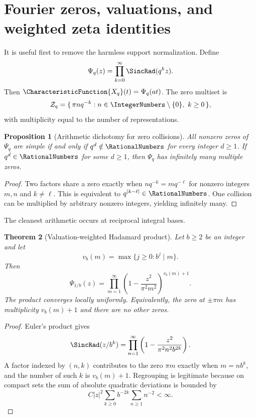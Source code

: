 \documentclass[11pt,oneside]{article}
\newtheorem{theorem}{Theorem}[section]
\newtheorem{proposition}[theorem]{Proposition}
\theoremstyle{definition}
\theoremstyle{remark}
\begin{document}
\section{Fourier zeros, valuations, and weighted zeta identities}
\label{sec:zeros}

It is useful first to remove the harmless support normalization.  Define
\begin{equation}
 \Psi_q(z)=\prod_{k=0}^{\infty}\SincRad(q^kz).
 \label{eq:Psiq}
\end{equation}
Then $\CharacteristicFunction{X_q}(t)=\Psi_q(at)$.  The zero multiset is
\begin{equation}
 \mathcal Z_q=\{\,\pi n q^{-k}:n\in\IntegerNumbers\setminus\{0\},\ k\ge0\,\},
 \label{eq:zero-multiset}
\end{equation}
with multiplicity equal to the number of representations.

\begin{proposition}[Arithmetic dichotomy for zero collisions]
All nonzero zeros of $\Psi_q$ are simple if and only if
$q^d\notin\RationalNumbers$ for every integer $d\ge1$.  If $q^d\in\RationalNumbers$ for some
$d\ge1$, then $\Psi_q$ has infinitely many multiple zeros.
\end{proposition}

\begin{proof}
Two factors share a zero exactly when
$nq^{-k}=mq^{-\ell}$ for nonzero integers $m,n$ and $k\ne\ell$.  This is equivalent to
$q^{|k-\ell|}\in\RationalNumbers$.  One collision can be multiplied by arbitrary nonzero
integers, yielding infinitely many.
\end{proof}

The cleanest arithmetic occurs at reciprocal integral bases.

\begin{theorem}[Valuation-weighted Hadamard product]
\label{thm:hadamard-valuation}
Let $b\ge2$ be an integer and let
\[
 v_b(m)=\max\{j\ge0:b^j\mid m\}.
\]
Then
\begin{equation}
 \Psi_{1/b}(z)=
 \prod_{m=1}^{\infty}
 \left(1-\frac{z^2}{\pi^2m^2}\right)^{v_b(m)+1}.
 \label{eq:valuation-hadamard}
\end{equation}
The product converges locally uniformly.  Equivalently, the zero at $\pm\pi m$ has
multiplicity $v_b(m)+1$ and there are no other zeros.
\end{theorem}

\begin{proof}
Euler's product gives
\[
 \SincRad(z/b^k)=\prod_{n=1}^{\infty}
 \left(1-\frac{z^2}{\pi^2n^2b^{2k}}\right).
\]
A factor indexed by $(n,k)$ contributes to the zero $\pi m$ exactly when
$m=nb^k$, and the number of such $k$ is $v_b(m)+1$.  Regrouping is legitimate because
on compact sets the sum of absolute quadratic deviations is bounded by
\[
 C|z|^2\sum_{k\ge0}b^{-2k}\sum_{n\ge1}n^{-2}<\infty.
\]
\end{proof}
\end{document}
